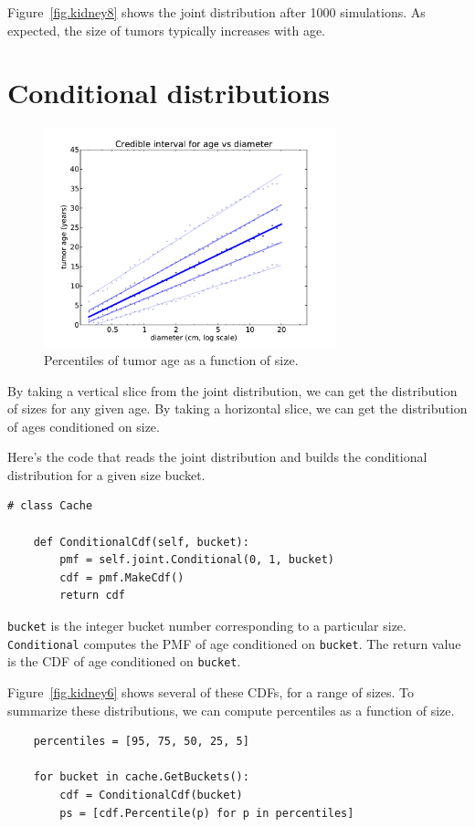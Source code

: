 \documentclass[12pt]{book}
\begin{document}
Figure~\ref{fig.kidney8} shows the joint distribution after 1000
simulations.  As expected, the size of tumors typically increases
with age.


\section{Conditional distributions}

\begin{figure}
\centerline{\includegraphics[height=2.5in]{figs/kidney7.pdf}}
\caption{Percentiles of tumor age as a function of size.}
\label{fig.kidney7}
\end{figure}

By taking a vertical slice from the joint distribution, we can get the
distribution of sizes for any given age.  By taking a horizontal
slice, we can get the distribution of ages conditioned on size.

Here's the code that reads the joint distribution and builds
the conditional distribution for a given size bucket.

\begin{verbatim}
# class Cache

    def ConditionalCdf(self, bucket):
        pmf = self.joint.Conditional(0, 1, bucket)
        cdf = pmf.MakeCdf()
        return cdf
\end{verbatim}

\verb"bucket" is the integer bucket number corresponding to a
particular size.  {\tt Conditional} computes the
PMF of age conditioned on {\tt bucket}.
The return value is the CDF of age conditioned on {\tt bucket}.

Figure~\ref{fig.kidney6} shows several of these CDFs, for
a range of sizes.  To summarize these distributions, we can
compute percentiles as a function of size.

\begin{verbatim}
    percentiles = [95, 75, 50, 25, 5]

    for bucket in cache.GetBuckets():
        cdf = ConditionalCdf(bucket)      
        ps = [cdf.Percentile(p) for p in percentiles]
\end{verbatim}
\end{document}
